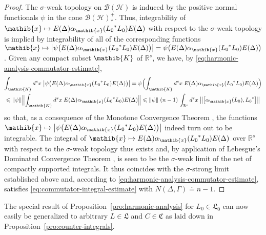 \documentclass[a4paper,a4paper]{article}
\numberwithin{equation}{section}
\newcommand{\Cfrak}{\mathfrak{C}}
\newcommand{\Lfrak}{\mathfrak{L}}
\newcommand{\Kib}{\mathib{K}}
\newcommand{\xib}{\mathib{x}}
\newcommand{\Rs}{\mathbb{R}^s}
\newcommand{\BH}{\mathscr{B} ( \mathscr{H} )}
\newcommand{\ED}{E ( \Delta )}
\newcommand{\aibx}{\alpha_\mathib{x}}
\theoremstyle{definition}
\theoremstyle{plain}
\theoremstyle{remark}
\newcommand{\bcomm}[2]{\bigl[ #1 , #2 \bigr]}
\newcommand{\babs}[1]{\bigl\lvert #1 \bigr\rvert}
\newcommand{\norm}[1]{\lVert #1 \rVert}
\newcommand{\bnorm}[1]{\bigl\lVert #1 \bigr\rVert}
\newcommand{\Bnorm}[1]{\Bigl\lVert #1 \Bigr\rVert}
\begin{document}
\begin{proof}
    The $\sigma$-weak topology on $\BH$ is induced by the positive
    normal functionals $\psi$ in the cone $\BH^+_*$. Thus,
    integrability of $\xib \mapsto \ED \aibx ( {L_0}^* L_0 ) \ED$ with
    respect to the $\sigma$-weak topology is implied by integrability
    of all of the corresponding functions $\xib \mapsto \babs{\psi
    \bigl( \ED \aibx ( {L_0}^* L_0 ) \ED \bigr)} = \psi \bigl( \ED
    \aibx ( {L_0}^* L_0 ) \ED \bigr)$. Given any compact subset $\Kib$
    of $\Rs$, we have, by
    \eqref{eq:harmonic-analysis-commutator-estimate},
    \begin{multline*}
      \int_\Kib d^s x \; \babs{\psi \bigl( \ED \aibx ( {L_0}^* L_0 )
      \ED \bigr)} = \psi \Bigl( \int_\Kib d^s x \; \ED \aibx ( {L_0}^*
      L_0 ) \ED \Bigr) \\
      \leqslant \norm{\psi} \Bnorm{\int_\Kib d^s x \; \ED \aibx (
      {L_0}^* L_0 ) \ED} \leqslant \norm{\psi} \; ( n - 1 ) \, \int_{\Rs}
      d^s x \; \bnorm{\bcomm{\aibx ( L_0 )}{{L_0}^*}}
    \end{multline*}
    so that, as a consequence of the Monotone Convergence Theorem
    \cite[II.2.7]{fell/doran:1988a}, the functions $\xib \mapsto
    \babs{\psi \bigl( \ED \aibx ( {L_0}^* L_0 ) \ED \bigr)}$ indeed
    turn out to be integrable. The integral of $\xib \mapsto \ED \aibx
    ( {L_0}^* L_0 ) \ED$ over $\Rs$ with respect to the $\sigma$-weak
    topology thus exists \cite[II.6.2]{fell/doran:1988a} and, by
    application of Lebesgue's Dominated Convergence Theorem
    \cite[II.5.6]{fell/doran:1988a}, is seen to be the $\sigma$-weak
    limit of the net of compactly supported integrals. It thus
    coincides with the $\sigma$-strong limit established above and,
    according to \eqref{eq:harmonic-analysis-commutator-estimate},
    satisfies \eqref{eq:commutator-integral-estimate} with $N ( \Delta
    , \Gamma ) \doteq n - 1$.
  \end{proof}
  The special result of Proposition~\ref{pro:harmonic-analysis} for
  $L_0 \in \Lfrak_0$ can now easily be generalized to arbitrary $L \in
  \Lfrak$ and $C \in \Cfrak$ as laid down in
  Proposition~\ref{pro:counter-integrals}.
\end{document}
